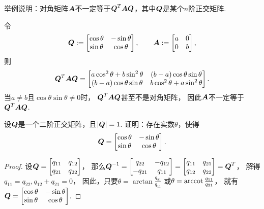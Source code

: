 \begin{example}
举例说明：对角矩阵\(\boldsymbol{A}\)不一定等于\(\boldsymbol{Q}^T \boldsymbol{A} \boldsymbol{Q}\)，其中\(\boldsymbol{Q}\)是某个\(n\)阶正交矩阵.
\begin{solution}
令\begin{equation*}
	\boldsymbol{Q} := \begin{bmatrix}
		\cos\theta & -\sin\theta \\
		\sin\theta & \cos\theta
	\end{bmatrix},
	\qquad
	\boldsymbol{A} := \begin{bmatrix}
		a & 0 \\
		0 & b
	\end{bmatrix},
\end{equation*}
则\begin{equation*}
	\boldsymbol{Q}^T \boldsymbol{A} \boldsymbol{Q}
	= \begin{bmatrix}
		a \cos^2\theta + b \sin^2\theta & (b-a) \cos\theta \sin\theta \\
		(b-a) \cos\theta \sin\theta & b \cos^2\theta + a \sin^2\theta
	\end{bmatrix}.
\end{equation*}
当\(a \neq b\)且\(\cos\theta \sin\theta \neq 0\)时，
\(\boldsymbol{Q}^T \boldsymbol{A} \boldsymbol{Q}\)甚至不是对角矩阵，
因此\(\boldsymbol{A}\)不一定等于\(\boldsymbol{Q}^T \boldsymbol{A} \boldsymbol{Q}\).
\end{solution}
\end{example}

\begin{example}
设\(\boldsymbol{Q}\)是一个二阶正交矩阵，且\(\abs{\boldsymbol{Q}} = 1\).
证明：存在实数\(\theta\)，使得\begin{equation*}
	\boldsymbol{Q} = \begin{bmatrix}
		\cos\theta & -\sin\theta \\
		\sin\theta & \cos\theta
	\end{bmatrix}.
\end{equation*}
\begin{proof}
设\(
	\boldsymbol{Q} = \begin{bmatrix}
		q_{11} & q_{12} \\
		q_{21} & q_{22}
	\end{bmatrix}
\)，
那么\(
	\boldsymbol{Q}^{-1}
	= \begin{bmatrix}
		q_{22} & -q_{12} \\
		-q_{21} & q_{11}
	\end{bmatrix}
	= \begin{bmatrix}
		q_{11} & q_{21} \\
		q_{12} & q_{22}
	\end{bmatrix}
	= \boldsymbol{Q}^T
\)，
解得\(
	q_{11} = q_{22},
	\allowbreak
	q_{12} + q_{21} = 0
\)，
因此，只要\(\theta = \arctan\frac{q_{21}}{q_{11}}\)
或\(\theta = \arccot\frac{q_{11}}{q_{21}}\)，
就有\(
	\boldsymbol{Q} = \begin{bmatrix}
		\cos\theta & -\sin\theta \\
		\sin\theta & \cos\theta
	\end{bmatrix}
\).
\end{proof}
\end{example}

